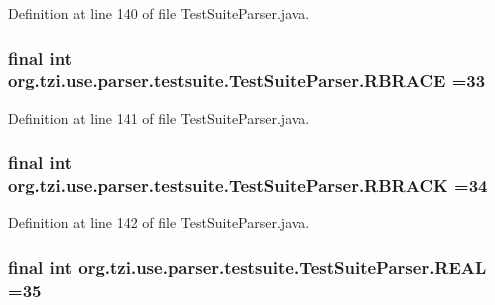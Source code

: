 Definition at line 140 of file Test\-Suite\-Parser.\-java.

\hypertarget{classorg_1_1tzi_1_1use_1_1parser_1_1testsuite_1_1_test_suite_parser_a8bd62158f1951f16325a826112687c7d}{
\subsubsection[{R\-B\-R\-A\-C\-E}]{\setlength{\rightskip}{0pt plus 5cm}final int org.\-tzi.\-use.\-parser.\-testsuite.\-Test\-Suite\-Parser.\-R\-B\-R\-A\-C\-E =33\hspace{0.3cm}{\ttfamily [static]}}}\label{classorg_1_1tzi_1_1use_1_1parser_1_1testsuite_1_1_test_suite_parser_a8bd62158f1951f16325a826112687c7d}


Definition at line 141 of file Test\-Suite\-Parser.\-java.

\hypertarget{classorg_1_1tzi_1_1use_1_1parser_1_1testsuite_1_1_test_suite_parser_ac45e9d6bbf92633d834f9ab69104d525}{
\subsubsection[{R\-B\-R\-A\-C\-K}]{\setlength{\rightskip}{0pt plus 5cm}final int org.\-tzi.\-use.\-parser.\-testsuite.\-Test\-Suite\-Parser.\-R\-B\-R\-A\-C\-K =34\hspace{0.3cm}{\ttfamily [static]}}}\label{classorg_1_1tzi_1_1use_1_1parser_1_1testsuite_1_1_test_suite_parser_ac45e9d6bbf92633d834f9ab69104d525}


Definition at line 142 of file Test\-Suite\-Parser.\-java.

\hypertarget{classorg_1_1tzi_1_1use_1_1parser_1_1testsuite_1_1_test_suite_parser_ab5b93bc96e8e9d98ea388fc73f54687a}{
\subsubsection[{R\-E\-A\-L}]{\setlength{\rightskip}{0pt plus 5cm}final int org.\-tzi.\-use.\-parser.\-testsuite.\-Test\-Suite\-Parser.\-R\-E\-A\-L =35\hspace{0.3cm}{\ttfamily [static]}}}\label{classorg_1_1tzi_1_1use_1_1parser_1_1testsuite_1_1_test_suite_parser_ab5b93bc96e8e9d98ea388fc73f54687a}


